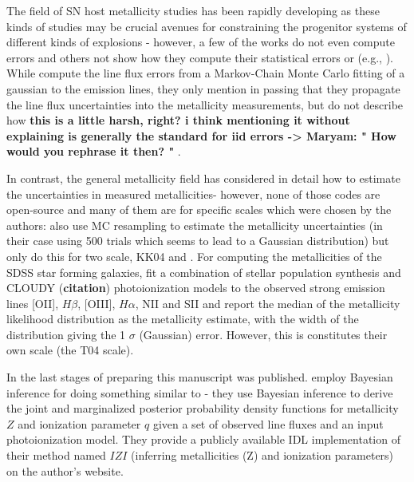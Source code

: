 \documentclass{emulateapj}
\begin{document}
The field of SN host metallicity studies has been rapidly developing as these kinds of studies may be crucial avenues for constraining the progenitor systems of different kinds of explosions - however, a few of the works do not even compute errors and others not show how they compute their statistical errors or  (e.g., \citet{anderson10,leloudas11,sanders12,leloudas14}). While \citet{sanders12} compute the line flux errors from a Markov-Chain Monte Carlo fitting of a gaussian to the emission lines, they only mention in passing that they propagate the line flux uncertainties into the metallicity measurements, but do not describe how {\bf this is a little harsh, right? i think mentioning it without explaining is generally the standard for iid errors -> Maryam: " How would you rephrase it then? " }.


In contrast, the general metallicity field has considered in detail how to estimate the uncertainties in measured metallicities- however, none of those codes are open-source and many of them are for specific scales which were chosen by the authors:  \citet{moustakas10} also use MC resampling to estimate the metallicity uncertainties (in their case using 500 trials which seems to lead to a Gaussian distribution) but only do this for two scale, KK04 and \citet{pilyugin05}. For computing the metallicities of the SDSS star forming galaxies, \citet{tremonti04} fit a combination of stellar population synthesis and CLOUDY ({\bf citation}) photoionization models to the observed strong emission lines [OII], $H\beta$, [OIII], $H\alpha$, NII and SII and report the median of the metallicity likelihood distribution as the metallicity estimate, with the width of the distribution giving the 1 $\sigma$ (Gaussian) error. However, this is constitutes their own scale (the T04 scale).

In the last stages of preparing this manuscript \citet{blanc15} was published.  \citet{blanc15} employ Bayesian inference for doing something similar to \citet{tremonti04} - they use Bayesian inference to derive the joint and marginalized posterior probability density functions for metallicity $Z$ and ionization parameter $q$ given a set of observed line fluxes and an input photoionization model. They provide a publicly available IDL implementation of their method named $IZI$ (inferring metallicities (Z) and ionization parameters) on the author's website.
\end{document}
